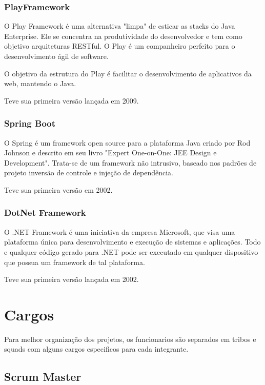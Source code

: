 \subsubsection{PlayFramework}

O Play Framework é uma alternativa "limpa" de esticar as stacks do Java Enterprise. Ele se concentra na produtividade do desenvolvedor e tem como objetivo arquiteturas RESTful. O Play é um companheiro perfeito para o desenvolvimento ágil de software.

O objetivo da estrutura do Play é facilitar o desenvolvimento de aplicativos da web, mantendo o Java.

Teve sua primeira versão lançada em 2009.

\subsubsection{Spring Boot}

O Spring é um framework open source para a plataforma Java criado por Rod Johnson e descrito em seu livro "Expert One-on-One: JEE Design e Development". Trata-se de um framework não intrusivo, baseado nos padrões de projeto inversão de controle e injeção de dependência.

Teve sua primeira versão em 2002.

\subsubsection{DotNet Framework}

O .NET Framework é uma iniciativa da empresa Microsoft, que visa uma plataforma única para desenvolvimento e execução de sistemas e aplicações. Todo e qualquer código gerado para .NET pode ser executado em qualquer dispositivo que possua um framework de tal plataforma.

Teve sua primeira versão lançada em 2002.

\section{Cargos}

Para melhor organização dos projetos, os funcionarios são separados em tribos e squads com alguns cargos especificos para cada integrante.

\subsection{Scrum Master}

